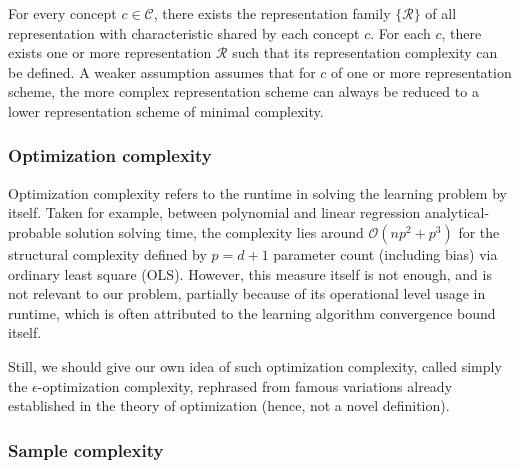 \documentclass[10pt]{article} %
\begin{document}
\begin{assumption}
    For every concept $c\in\mathcal{C}$, there exists the representation family $\{\mathcal{R}\}$ of all representation with characteristic shared by each concept $c$. For each $c$, there exists one or more representation $\mathcal{R}$ such that its representation complexity can be defined. A weaker assumption assumes that for $c$ of one or more representation scheme, the more complex representation scheme can always be reduced to a lower representation scheme of minimal complexity.
\end{assumption}

\subsubsection{Optimization complexity}

Optimization complexity refers to the runtime in solving the learning problem by itself. Taken for example, between polynomial and linear regression analytical-probable solution solving time, the complexity lies around $\mathcal{O}(np^{2}+p^{3})$ for the structural complexity defined by $p=d+1$ parameter count (including bias) via ordinary least square (OLS). However, this measure itself is not enough, and is not relevant to our problem, partially because of its operational level usage in runtime, which is often attributed to the learning algorithm convergence bound itself. 

Still, we should give our own idea of such optimization complexity, called simply the $\epsilon$-optimization complexity, rephrased from famous variations already established in the theory of optimization (hence, not a novel definition). 

\subsubsection{Sample complexity}
\end{document}
